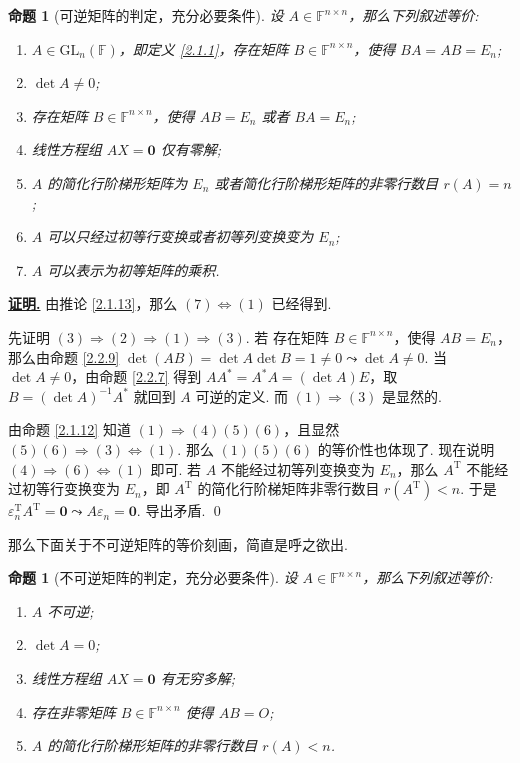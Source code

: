 \documentclass[10pt,openany]{article}
\theoremstyle{thmstyle} %
\theoremstyle{defstyle} %
\theoremstyle{prostyle} %
\newtheorem{proposition}[theorem]{命题}
\theoremstyle{exastyle}
\theoremstyle{remstyle}
\renewenvironment{proof}[1][证明]{\par\underline{\textbf{#1.}} \;\fangsong}{\qed\par}
\newcommand{\T}{^{\text{T}}}
\newcommand{\F}{\mathbb{F}}
\newcommand{\gfn}{\text{GL}_n(\mathbb{F})}
\newcommand{\n}{^{n \times n}}
\begin{document}
\begin{proposition}[可逆矩阵的判定，充分必要条件]	\label{2.2.13}
	设 \( A \in \F\n \)，那么下列叙述等价:
	\begin{enumerate}[(1)]
		\item \( A \in \gfn \)，即定义 \ref{2.1.1}，存在矩阵 \( B \in \F\n \)，使得 \( BA=AB=E_n \);
		\item \( \det A \neq 0 \);
		\item 存在矩阵 \( B \in \F\n \)，使得 \( AB=E_n \) 或者 \( BA=E_n \);
		\item 线性方程组 \( AX=\bm{0} \) 仅有零解;
		\item \( A \) 的简化行阶梯形矩阵为 \( E_n \) 或者简化行阶梯形矩阵的非零行数目 \( r(A)=n \);
		\item \( A \) 可以只经过初等行变换或者初等列变换变为 \( E_n \);
		\item \( A \) 可以表示为初等矩阵的乘积.
	\end{enumerate}

\end{proposition}

\begin{proof}
	由推论 \ref{2.1.13}，那么 \( (7) \Leftrightarrow (1) \) 已经得到.
	 
	先证明 \( (3) \Rightarrow (2) \Rightarrow (1) \Rightarrow (3) \). 若 存在矩阵 \( B \in \F\n \)，使得 \( AB=E_n \)，那么由命题 \ref{2.2.9} \( \det(AB)=\det A \det B=1 \neq 0 \leadsto \det A \neq 0 \). 当 \( \det A \neq 0 \)，由命题 \ref{2.2.7} 得到 \( AA^*=A^*A=(\det A) E \)，取 \( B=(\det A)^{-1}A^* \) 就回到 \( A \) 可逆的定义. 而 \( (1) \Rightarrow (3) \) 是显然的.
	
	由命题 \ref{2.1.12} 知道 \( (1)  \Rightarrow (4)(5)(6) \)，且显然 \( (5)(6) \Rightarrow (3) \Leftrightarrow (1) \). 那么 \( (1)(5)(6) \) 的等价性也体现了. 现在说明 \( (4) \Rightarrow (6) \Leftrightarrow (1) \) 即可. 若 \( A \) 不能经过初等列变换变为 \( E_n \)，那么 \( A\T \) 不能经过初等行变换变为 \( E_n \)，即 \( A\T \) 的简化行阶梯矩阵非零行数目 \( r(A\T) <n \). 于是 \( \varepsilon_n\T A\T=\bm{0} \leadsto A\varepsilon_n=\bm{0} \). 导出矛盾.
\end{proof}

那么下面关于不可逆矩阵的等价刻画，简直是呼之欲出.

\begin{proposition}[不可逆矩阵的判定，充分必要条件]	\label{2.2.14}
	设 \( A \in \F\n \)，那么下列叙述等价:
	\begin{enumerate}[(1)]
		\item \( A \) 不可逆;
		\item \( \det A = 0 \);
		\item 线性方程组 \( AX=\bm{0} \) 有无穷多解;
		\item 存在非零矩阵 \( B \in \F\n \) 使得 \( AB=O \);
		\item \( A \) 的简化行阶梯形矩阵的非零行数目 \( r(A)<n \).
	\end{enumerate}

\end{proposition}
\end{document}
